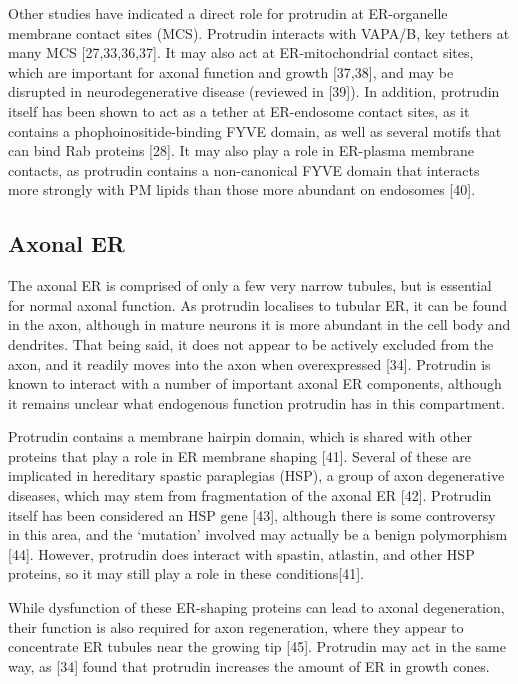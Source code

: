 \documentclass[
  12pt,
  a4paper,
]{book}
\begin{document}
Other studies have indicated a direct role for protrudin at ER-organelle membrane contact sites (MCS). Protrudin interacts with VAPA/B, key tethers at many MCS {[}27,33,36,37{]}. It may also act at ER-mitochondrial contact sites, which are important for axonal function and growth {[}37,38{]}, and may be disrupted in neurodegenerative disease (reviewed in {[}39{]}). In addition, protrudin itself has been shown to act as a tether at ER-endosome contact sites, as it contains a phophoinositide-binding FYVE domain, as well as several motifs that can bind Rab proteins {[}28{]}. It may also play a role in ER-plasma membrane contacts, as protrudin contains a non-canonical FYVE domain that interacts more strongly with PM lipids than those more abundant on endosomes {[}40{]}.

\hypertarget{intro-ptdn-axonalER}{%
\subsection{Axonal ER}\label{intro-ptdn-axonalER}}

The axonal ER is comprised of only a few very narrow tubules, but is essential for normal axonal function. As protrudin localises to tubular ER, it can be found in the axon, although in mature neurons it is more abundant in the cell body and dendrites. That being said, it does not appear to be actively excluded from the axon, and it readily moves into the axon when overexpressed {[}34{]}. Protrudin is known to interact with a number of important axonal ER components, although it remains unclear what endogenous function protrudin has in this compartment.

Protrudin contains a membrane hairpin domain, which is shared with other proteins that play a role in ER membrane shaping {[}41{]}. Several of these are implicated in hereditary spastic paraplegias (HSP), a group of axon degenerative diseases, which may stem from fragmentation of the axonal ER {[}42{]}. Protrudin itself has been considered an HSP gene {[}43{]}, although there is some controversy in this area, and the `mutation' involved may actually be a benign polymorphism {[}44{]}. However, protrudin does interact with spastin, atlastin, and other HSP proteins, so it may still play a role in these conditions{[}41{]}.

While dysfunction of these ER-shaping proteins can lead to axonal degeneration, their function is also required for axon regeneration, where they appear to concentrate ER tubules near the growing tip {[}45{]}. Protrudin may act in the same way, as {[}34{]} found that protrudin increases the amount of ER in growth cones.
\end{document}

